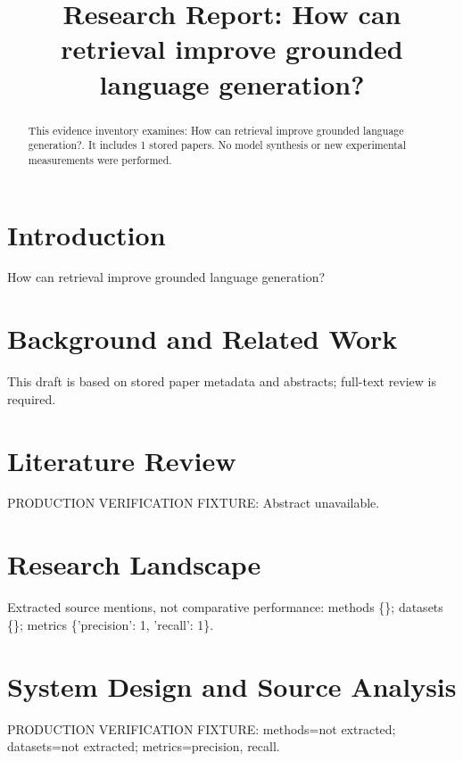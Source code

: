 \documentclass[conference]{IEEEtran}
\begin{document}
\title{Research Report: How can retrieval improve grounded language generation?}

\author{}

\maketitle

\begin{abstract}

This evidence inventory examines: How can retrieval improve grounded language generation?. It includes 1 stored papers. No model synthesis or new experimental measurements were performed.

\end{abstract}

\section{Introduction}

How can retrieval improve grounded language generation?

\section{Background and Related Work}

This draft is based on stored paper metadata and abstracts; full-text review is required.

\section{Literature Review}

\cite{ref1} PRODUCTION VERIFICATION FIXTURE: Abstract unavailable.

\section{Research Landscape}

Extracted source mentions, not comparative performance: methods \{\}; datasets \{\}; metrics \{'precision': 1, 'recall': 1\}.

\section{System Design and Source Analysis}

\cite{ref1} PRODUCTION VERIFICATION FIXTURE: methods=not extracted; datasets=not extracted; metrics=precision, recall.
\end{document}

